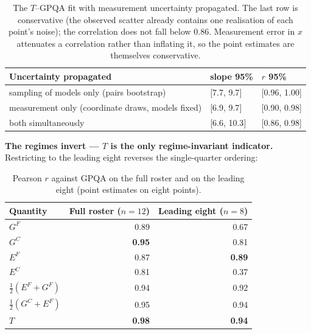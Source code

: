 \documentclass{article}
\begin{document}
\begin{table}[H]
\caption{The \(T\)--GPQA fit with measurement uncertainty propagated. The last row is conservative (the observed scatter already contains one realisation of each point's noise); the correlation does not fall below 0.86. Measurement error in \(x\) attenuates a correlation rather than inflating it, so the point estimates are themselves conservative.}
\begin{center}\small
\begin{tabular}{@{}lll@{}}
\toprule\noalign{}
Uncertainty propagated & slope 95\% & \(r\) 95\% \\
\midrule\noalign{}
sampling of models only (pairs bootstrap) & {[}7.7, 9.7{]} & {[}0.96, 1.00{]} \\
measurement only (coordinate draws, models fixed) & {[}6.9, 9.7{]} & {[}0.90, 0.98{]} \\
both simultaneously & {[}6.6, 10.3{]} & {[}0.86, 0.98{]} \\
\bottomrule
\end{tabular}
\end{center}
\end{table}

\textbf{The regimes invert --- \(T\) is the only regime-invariant indicator.} Restricting to the leading eight reverses the single-quarter ordering:

\begin{table}[H]
\caption{Pearson \(r\) against GPQA on the full roster and on the leading eight (point estimates on eight points).}
\begin{center}\small
\begin{tabular}{@{}lrr@{}}
\toprule\noalign{}
Quantity & Full roster (\(n=12\)) & Leading eight (\(n=8\)) \\
\midrule\noalign{}
\(G^{F}\) &\cellcolor[HTML]{22318D}\textcolor[HTML]{FFFFFF}{0.89}&\cellcolor[HTML]{1F7FB7}\textcolor[HTML]{FFFFFF}{0.67} \\
\(G^{C}\) &\cellcolor[HTML]{142670}\textcolor[HTML]{FFFFFF}{\textbf{0.95}}&\cellcolor[HTML]{234A9E}\textcolor[HTML]{FFFFFF}{0.81} \\
\(E^{F}\) &\cellcolor[HTML]{253695}\textcolor[HTML]{FFFFFF}{0.87}&\cellcolor[HTML]{22318D}\textcolor[HTML]{FFFFFF}{\textbf{0.89}} \\
\(E^{C}\) &\cellcolor[HTML]{234A9E}\textcolor[HTML]{FFFFFF}{0.81}&\cellcolor[HTML]{82CEBB}\textcolor[HTML]{000000}{0.37} \\
\(\tfrac12(E^{F}+G^{F})\) &\cellcolor[HTML]{162875}\textcolor[HTML]{FFFFFF}{0.94}&\cellcolor[HTML]{1B2C7E}\textcolor[HTML]{FFFFFF}{0.92} \\
\(\tfrac12(G^{C}+E^{F})\) &\cellcolor[HTML]{142670}\textcolor[HTML]{FFFFFF}{0.95}&\cellcolor[HTML]{162875}\textcolor[HTML]{FFFFFF}{0.94} \\
\(T\) &\cellcolor[HTML]{0D2162}\textcolor[HTML]{FFFFFF}{\textbf{0.98}}&\cellcolor[HTML]{162875}\textcolor[HTML]{FFFFFF}{\textbf{0.94}} \\
\bottomrule
\end{tabular}
\end{center}
\end{table}
\end{document}
